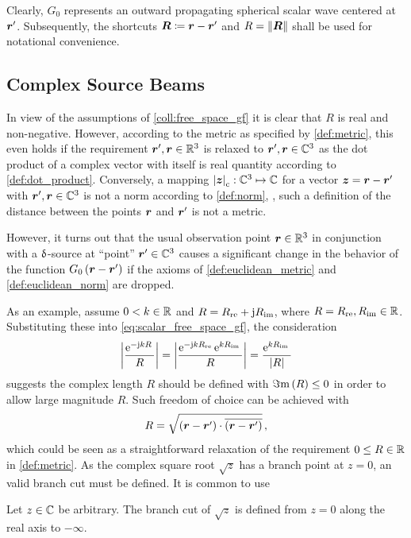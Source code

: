 Clearly, $G_0$ represents an outward propagating spherical scalar wave 
centered at $\rsrc$.
Subsequently, the shortcuts $\pvec{R} \coloneqq \rdiff$ and
$R = \norm{\pvec{R}}$ shall be used for notational convenience.







\subsection{Complex Source Beams}

In view of the assumptions of \cref{coll:free_space_gf} it is clear that
$R$ is real and non-negative.
However, according to the metric as specified by \cref{def:metric}, this even
holds if the requirement $\rsrc, \robs \in \R^3$ is relaxed to
$\rsrc, \robs \in \C^3$ as the dot product of a complex vector with itself
is real quantity according to \cref{def:dot_product}.
Conversely, a mapping $\cmplxlength{\pvec{z}}: \C^3 \mapsto \C$ for a vector
$\pvec{z} = \rdiff$ with $\rsrc, \robs \in \C^3$ is not a norm according
to \cref{def:norm}, \ie, such a definition of the distance between the
points $\robs$ and $\rsrc$ is not a metric.

However, it turns out that the usual observation point $\robs \in \R^3$ 
in conjunction with a $\operatorname{\updelta}$-source at \enquote{point} $\rsrc \in \C^3$
causes a significant change in the behavior of the function
$G_0 \left(\rdiff\right)$ if the axioms of \cref{def:euclidean_metric} and
\cref{def:euclidean_norm} are dropped.

As an example, assume $0 < k \in \mathbb{R}$ and
$R = R_\mathrm{re} + \mathrm{j} R_\mathrm{im}$, where
$R = R_\mathrm{re}, R_\mathrm{im} \in \mathbb{R}$.
Substituting these into \eqref{eq:scalar_free_space_gf}, the consideration
\begin{equation}\label{eq:example_csb}
	\left\vert\frac{\mathrm{e}^{-\mathrm{j} k R}\,}{R}\right\vert = 
	\left\vert \frac{\mathrm{e}^{-\mathrm{j} k R_\mathrm{re}}\, \mathrm{e}^{k R_\mathrm{im}}\,}{R} \right\vert = 
	\frac{\mathrm{e}^{k R_\mathrm{im}}\,}{\left\vert R\right\vert}
\end{equation}
suggests the complex length $R$ should be defined with $\Im\mathrm{m}\left(R\right) \leq 0$ in
order to allow large magnitude $R$. Such freedom of choice can be achieved
with
\begin{equation}
	R = \sqrt{\left(\rdiff\right) \cdot \overline{\left(\rdiff\right)}}
	\, ,
\end{equation}
which could be seen as a straightforward relaxation of the requirement
$0 \leq R \in \mathbb{R}$ in \cref{def:metric}.
As the complex square root $\sqrt{z}$ has a branch point at $z = 0$, an
valid branch cut must be defined.
It is common to use
\begin{definition}
	\label{def:sqrt_standard_branch_cut}
	Let $z \in \mathbb{C}$ be arbitrary.
	The branch cut of $\sqrt{z}$ is defined from $z = 0$ along the real axis
	to $-\infty$.
\end{definition}

